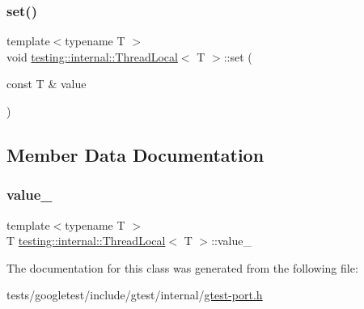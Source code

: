 \mbox{\label{classtesting_1_1internal_1_1ThreadLocal_ab5ebc7ba07426cef7167afa2a7707eb4}} 
\subsubsection{\texorpdfstring{set()}{set()}}
{\footnotesize\ttfamily template$<$typename T $>$ \\
void \hyperlink{classtesting_1_1internal_1_1ThreadLocal}{testing\+::internal\+::\+Thread\+Local}$<$ T $>$\+::set (\begin{DoxyParamCaption}\item[{const T \&}]{value }\end{DoxyParamCaption})\hspace{0.3cm}{\ttfamily [inline]}}



\subsection{Member Data Documentation}
\mbox{\label{classtesting_1_1internal_1_1ThreadLocal_ae0db6b57bdb752feb343ee4d935708e2}} 
\subsubsection{\texorpdfstring{value\+\_\+}{value\_}}
{\footnotesize\ttfamily template$<$typename T $>$ \\
T \hyperlink{classtesting_1_1internal_1_1ThreadLocal}{testing\+::internal\+::\+Thread\+Local}$<$ T $>$\+::value\+\_\+\hspace{0.3cm}{\ttfamily [private]}}



The documentation for this class was generated from the following file\+:\begin{DoxyCompactItemize}
\item 
tests/googletest/include/gtest/internal/\hyperlink{gtest-port_8h}{gtest-\/port.\+h}\end{DoxyCompactItemize}
